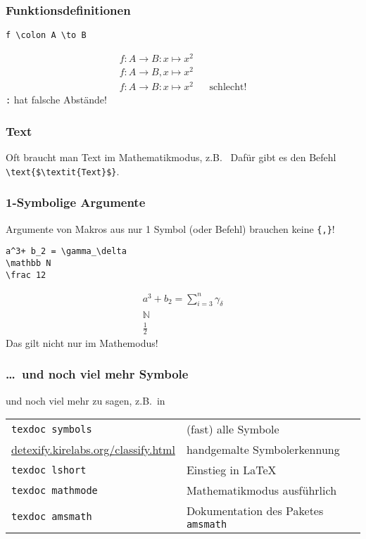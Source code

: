 \begin{frame}[fragile]
  \frametitle{Funktionsdefinitionen}
\begin{lstlisting}
f \colon A \to B
\end{lstlisting}
  \begin{align*}
    f \colon A \to B \colon x \mapsto x^2 && \\
    f \colon A \to B, x \mapsto x^2 && \\
    f : A \to B : x \mapsto x^2 && \text{schlecht!}
  \end{align*}
  \lstinline|:| hat falsche Abstände!
\end{frame}

\begin{frame}[fragile]
  \frametitle{Text}
  Oft braucht man Text im Mathematikmodus, z.B.\
  Dafür gibt es den Befehl \lstinline|\text{$\textit{Text}$}|.
\end{frame}

\begin{frame}[fragile]
  \frametitle{1-Symbolige Argumente}
  Argumente von Makros aus nur 1 Symbol (oder Befehl) brauchen keine \lstinline|{,}|!
  \begin{lstlisting}
a^3+ b_2 = \gamma_\delta
\mathbb N
\frac 12
\end{lstlisting}
  \begin{align*}
    a^3+ b_2 = \sum_{i = 3}^n \gamma_\delta \\
    \mathbb N \\
    \frac 12
  \end{align*}
  Das gilt nicht nur im Mathemodus!
\end{frame}
\begin{frame}[fragile]
  \frametitle{\dots\ und noch viel mehr Symbole}

  und noch viel mehr zu sagen, z.B.\ in
  \begin{center}
    \begin{tabular}{p{}p{}}
      \lstinline|texdoc symbols| & (fast) alle Symbole \\
      \url{detexify.kirelabs.org/}\newline\url{classify.html} & handgemalte Symbolerkennung \\
      \lstinline|texdoc lshort| & Einstieg in \LaTeX \\
      \lstinline|texdoc mathmode| & Mathematikmodus ausführlich\\
      \lstinline|texdoc amsmath| & Dokumentation des Paketes \lstinline|amsmath|
    \end{tabular}
  \end{center}

\end{frame}

